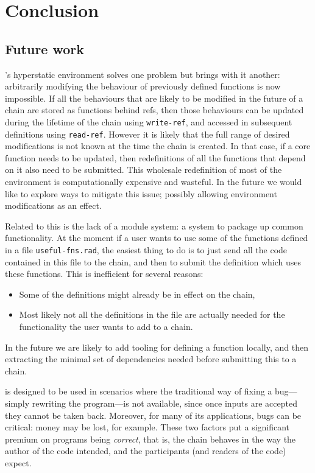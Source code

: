 \section{Conclusion}

\subsection{Future work}

\rad's hyperstatic environment solves one problem but brings with it another:
arbitrarily modifying the behaviour of previously defined functions is now
impossible. If all the behaviours that are likely to be modified in the future of
a chain are stored as functions behind refs, then those behaviours can be
updated during the lifetime of the chain using \texttt{write-ref}, and accessed
in subsequent definitions using \texttt{read-ref}. However it is likely that the
full range of desired modifications is not known at the time the chain is
created. In that case, if a core function needs to be updated, then
redefinitions of all the functions that depend on it also need to be submitted.
This wholesale redefinition of most of the environment is computationally
expensive and wasteful. In the future we would like to explore ways to mitigate
this issue; possibly allowing environment modifications as an effect.

Related to this is the lack of a module system: a system to package up common
functionality. At the moment if a user wants to use some of the functions
defined in a file \texttt{useful-fns.rad}, the easiest thing to do is to just
send all the code contained in this file to the chain, and then to submit the
definition which uses these functions. This is inefficient for several reasons:
\begin{itemize}
  \item Some of the definitions might already be in effect on the chain,
  \item Most likely not all the definitions in the file are actually needed for
    the functionality the user wants to add to a chain.
\end{itemize}
In the future we are likely to add tooling for defining a function locally, and
then extracting the minimal set of dependencies needed before submitting this to
a chain.

\rad{} is designed to be used in scenarios where the traditional way of fixing a bug---simply rewriting the program---is not available, since once inputs are accepted they cannot be taken back. Moreover, for many of its applications, bugs can be critical: money may be lost, for example. These two factors put a significant premium on programs being \emph{correct}, that is, the chain
behaves in the way the author of the code intended, and the participants (and
readers of the code) expect.

